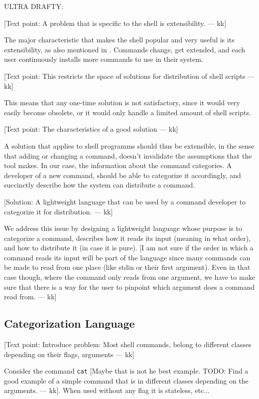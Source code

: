 \documentclass[sigplan,10pt,review,anonymous]{acmart}
\newcommand{\kk}[1]{[{\color{magenta}#1 --- kk}]}
\begin{document}
ULTRA DRAFTY:

\kk{Text point: A problem that is specific to the shell is
  extensibility.}

The major characteristic that makes the shell popular and very useful
is its extensibility, as also mentioned in . Commands change,
get extended, and each user continuously installs more commands to use
in their system.

\kk{Text point: This restricts the space of solutions for distribution
  of shell scripts}

This means that any one-time solution is not satisfactory, since it
would very easily become obsolete, or it would only handle a limited
amount of shell scripts.

\kk{Text point: The characteristics of a good solution}

A solution that applies to shell programms should thus be extensible,
in the sense that adding or changing a command, doesn't invalidate the
assumptions that the tool makes. In our case, the information about
the command categories. A developer of a new command, should be able
to categorize it accordingly, and succinctly describe how the system
can distribute a command.

\kk{Solution: A lightweight language that can be used by a command
  developer to categorize it for distribution.}

We address this issue by designing a lightweight language whose
purpose is to categorize a command, describes how it reads its input
(meaning in what order), and how to distribute it (in case it is
pure). \kk{I am not sure if the order in which a command reads its
  input will be part of the language since many commands can be made
  to read from one place (like stdin or their first argument). Even in
  that case though, where the command only reads from one argument, we
  have to make sure that there is a way for the user to pinpoint which
  argument does a command read from.}

\subsection{Categorization Language}

\kk{Text point: Introduce problem: Most shell commands, belong to
  different classes depending on their flags, arguments}

Consider the command \texttt{cat} \kk{Maybe that is not he best
  example. TODO: Find a good example of a simple command that is in
  different classes depending on the arguments.}. When used without
any flag it is stateless, etc...
\end{document}
